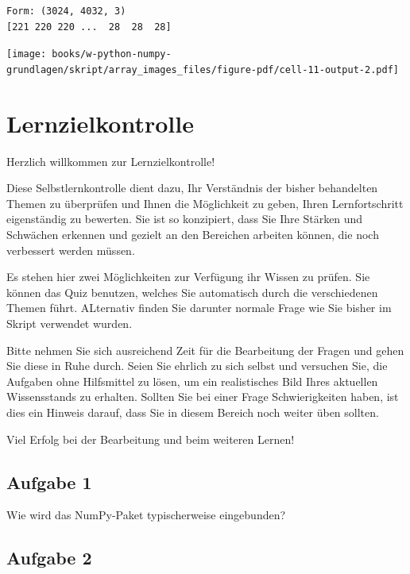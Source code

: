 \documentclass[
  letterpaper,
  DIV=11,
  numbers=noendperiod]{scrreprt}
\begin{document}
\begin{tcolorbox}
\begin{tcolorbox}
\begin{verbatim}
Form: (3024, 4032, 3)
[221 220 220 ...  28  28  28]
\end{verbatim}

\texttt{[image: books/w-python-numpy-grundlagen/skript/array\_images\_files/figure-pdf/cell-11-output-2.pdf]}

\end{tcolorbox}

\end{tcolorbox}

\chapter{Lernzielkontrolle}\label{lernzielkontrolle-1}

Herzlich willkommen zur Lernzielkontrolle!

Diese Selbstlernkontrolle dient dazu, Ihr Verständnis der bisher
behandelten Themen zu überprüfen und Ihnen die Möglichkeit zu geben,
Ihren Lernfortschritt eigenständig zu bewerten. Sie ist so konzipiert,
dass Sie Ihre Stärken und Schwächen erkennen und gezielt an den
Bereichen arbeiten können, die noch verbessert werden müssen.

Es stehen hier zwei Möglichkeiten zur Verfügung ihr Wissen zu prüfen.
Sie können das Quiz benutzen, welches Sie automatisch durch die
verschiedenen Themen führt. ALternativ finden Sie darunter normale Frage
wie Sie bisher im Skript verwendet wurden.

Bitte nehmen Sie sich ausreichend Zeit für die Bearbeitung der Fragen
und gehen Sie diese in Ruhe durch. Seien Sie ehrlich zu sich selbst und
versuchen Sie, die Aufgaben ohne Hilfsmittel zu lösen, um ein
realistisches Bild Ihres aktuellen Wissensstands zu erhalten. Sollten
Sie bei einer Frage Schwierigkeiten haben, ist dies ein Hinweis darauf,
dass Sie in diesem Bereich noch weiter üben sollten.

Viel Erfolg bei der Bearbeitung und beim weiteren Lernen!

\section*{Aufgabe 1}\label{aufgabe-1}


Wie wird das NumPy-Paket typischerweise eingebunden?

\section*{Aufgabe 2}\label{aufgabe-2}
\end{document}
